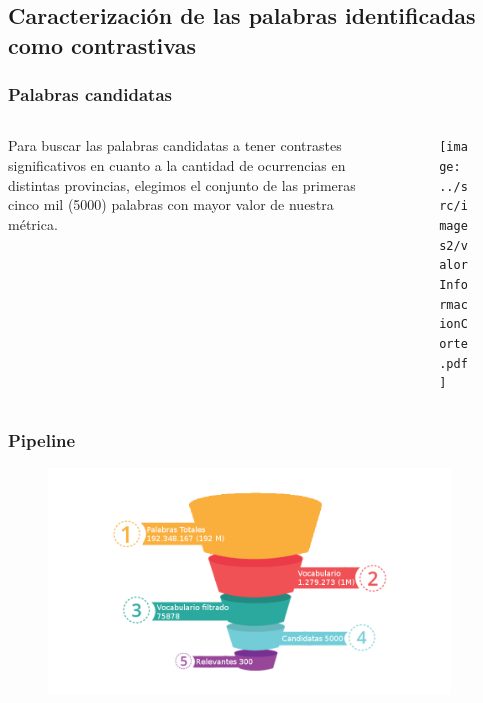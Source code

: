 \subsection{Caracterización de las palabras identificadas como contrastivas}

\begin{frame}[t]\frametitle{Palabras candidatas}

    \begin{columns}
        \begin{column}{.5\textwidth}
        Para buscar las palabras candidatas a tener contrastes significativos en cuanto a la cantidad de ocurrencias en distintas provincias, elegimos el conjunto de las primeras 
        cinco mil (5000) palabras con mayor valor de nuestra métrica.

        \end{column}

        \begin{column}{.45\textwidth}
            \begin{figure}
            \centering
            \texttt{[image: ../src/images2/valorInformacionCorte.pdf]}
            \label{fig:ivalue}
            \end{figure}
        \end{column}
    \end{columns}

\end{frame}

\begin{frame}[t]\frametitle{Pipeline}
    
\begin{figure}
  \centering
  \includegraphics[width=0.95\textwidth]{../src/images/presentacion/embudo.png}
  \label{fig:embudo}
\end{figure}

\end{frame}


